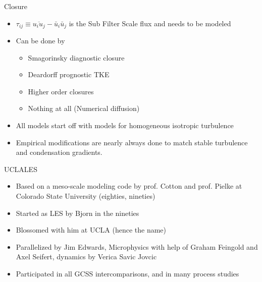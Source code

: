 \documentclass[handout]{beamer}
\begin{document}
\begin{frame}{Closure}
 \begin{itemize}
  \item $\tau_{ij} \equiv \overline{u_i u_j} - \bar{u}_i \bar{u}_j $ is the Sub Filter Scale flux and needs to be modeled
  \item Can be done by
  \begin{itemize}
   \item Smagorinsky diagnostic closure
   \item Deardorff prognostic TKE
   \item Higher order closures
   \item Nothing at all (Numerical diffusion)
  \end{itemize}
  \item All models start off with models for homogeneous isotropic turbulence 
  \item Empirical modifications are nearly always done to match stable turbulence and condensation gradients.
 \end{itemize}
\end{frame}
\begin{frame}{UCLALES}
 \begin{itemize}
  \item Based on a meso-scale modeling code by prof. Cotton and prof. Pielke at Colorado State University  (eighties, nineties)
  \item Started as LES by Bjorn in the nineties
  \item Blossomed with him at UCLA (hence the name)
  \item Parallelized by Jim Edwards, Microphysics with help of Graham Feingold and Axel Seifert, dynamics by Verica Savic Jovcic
  \item Participated in all GCSS intercomparisons, and in many process studies
 \end{itemize}

\end{frame}
\end{document}
